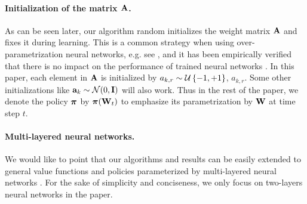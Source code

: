 

\paragraph{Initialization of the matrix ${\mathbf{A}}$.} 
As can be seen later, our algorithm random initializes the weight matrix ${\mathbf{A}}$ and fixes it during learning. 
This is a common strategy when using over-parametrization neural networks, e.g. see \citep{li2018learning,du2018gradientA,du2018gradientB,allen2018convergenceA,allen2018convergenceB}, and it has been empirically verified that there is no impact on the performance of trained neural networks \citep{hoffer2018fix}.
In this paper, each element in ${\mathbf{A}}$ is initialized by $a_{k,r} \sim {\mathcal{U}}\left\{-1, +1\right\}$, $a_{k,r}$. Some other initializations like ${\mathbf{a}}_k \sim {\mathcal{N}}(0, {\mathbf{I}})$ will also work. Thus in the rest of the paper, we denote the policy ${\boldsymbol{\pi}}$ by ${\boldsymbol{\pi}}({\mathbf{W}}_t)$ to emphasize its parametrization by ${\mathbf{W}}$ at time step $t$. 

\paragraph{Multi-layered neural networks.} We would like to point that our algorithms and results can be easily extended to general value functions and policies parameterized by multi-layered neural networks \citep{allen2018convergenceA,allen2018convergenceB,du2018gradientA}. For the sake of simplicity and conciseness, we only focus on two-layers neural networks in the paper.


